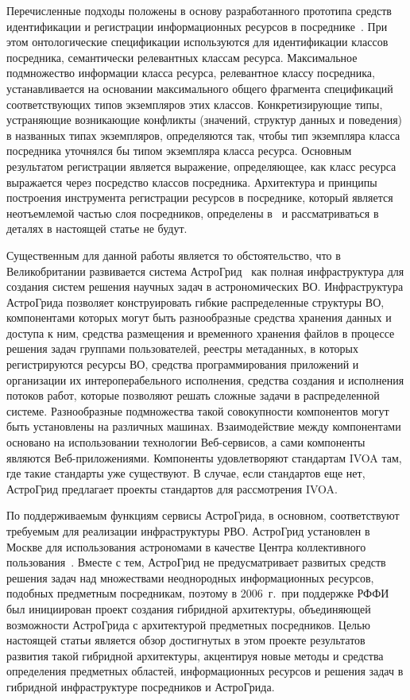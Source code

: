 \begin{multicols}{2}
     Перечисленные подходы положены в основу разработанного прототипа средств
идентификации и регистрации информационных ресурсов в посреднике~\cite{Briu01}.
При этом онтологические спецификации используются для идентификации классов
посредника, семантически релевантных классам ресурса. Максимальное подмножество
информации класса ресурса, релевантное классу посредника, устанавливается на
основании максимального общего фрагмента спецификаций соответствующих типов
экземпляров этих классов. Конкретизирующие типы, устраняющие возникающие
конфликты (значений, структур данных и поведения) в названных типах экземпляров,
определяются так, чтобы тип экземпляра класса посредника уточнялся бы типом
экземпляра класса ресурса. Основным результатом регистрации является выражение,
опре\-де\-ля\-ющее, как класс ресурса выражается через посредство классов посредника.
Архитектура и принципы построения инструмента регистрации ресурсов в посреднике,
который является неотъемлемой \mbox{частью} слоя посредников, определены в~\cite{Briu01} и
рассматриваться в деталях в настоящей статье не будут.

     Существенным для данной работы является то обстоятельство, что в
Великобритании развивается система АстроГрид~\cite{AsGr} как полная инфраструктура
для создания систем решения научных задач в астрономических ВО. Инфраструктура
АстроГрида позволяет конструировать гибкие распределенные структуры ВО,
компонентами которых могут быть разнообразные средства хранения данных и доступа к
ним, средства размещения и временного хранения файлов в процессе решения задач
группами пользователей, реестры метаданных, в которых регистрируются ресурсы ВО,
средства программирования приложений и организации их интероперабельного
исполнения, средства создания и исполнения потоков работ, которые позволяют решать
сложные задачи в распределенной системе. Разнообразные подмножества такой
совокупности компонентов могут быть установлены на различных машинах.
Взаимодействие между компонентами основано на использовании технологии
     Веб-сервисов, а сами компоненты являются Веб-приложениями. Компоненты
удовлетворяют стандартам IVOA там, где такие стандарты уже существуют. В случае,
если стандартов еще нет, АстроГрид предлагает проекты стандартов для рассмотрения
IVOA.

     По поддерживаемым функциям сервисы АстроГрида, в основном, соответствуют
требуемым для реализации инфраструктуры РВО. АстроГрид установлен в Москве для
использования астрономами в качестве Центра коллективного
пользования~\cite{RVOpu}. Вместе с тем, АстроГрид не предусматривает развитых
средств решения задач над множествами неоднородных информационных ресурсов,
подобных предметным посредникам, поэтому в 2006~г.\ при поддержке РФФИ был
инициирован проект создания гибридной архитектуры, объединяющей возможности
АстроГрида с архитектурой предметных посредников. Целью настоящей статьи является
обзор достигнутых в этом проекте результатов развития такой гибридной архитектуры,
акцентируя новые методы и средства определения предметных областей,
информационных ресурсов и решения задач в гибридной инфраструктуре посредников и
АстроГрида.


\end{multicols}
